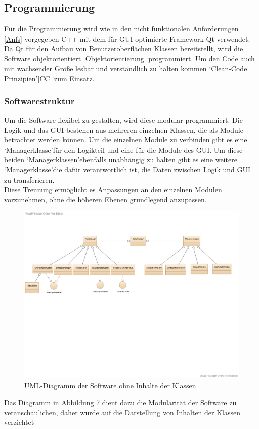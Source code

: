\documentclass[12pt,a4paper]{article}
\begin{document}
\subsection{Programmierung}
Für die Programmierung wird wie in den nicht funktionalen Anforderungen \ref{Anfs} vorgegeben C++ mit dem für GUI optimierte Framework Qt verwendet. \\
Da Qt für den Aufbau von Benutzeroberflächen Klassen bereitstellt, wird die Software objektorientiert \ref{Objektorientierung} programmiert. Um den Code auch mit wachsender Größe lesbar und verständlich zu halten kommen \lq Clean-Code Prinzipien\rq\space\ref{CC} zum Einsatz.\\
\subsubsection{Softwarestruktur}
Um die Software flexibel zu gestalten, wird diese modular programmiert. Die Logik und das GUI bestehen aus mehreren einzelnen Klassen, die als Module betrachtet werden können. Um die einzelnen Module zu verbinden gibt es eine \lq Managerklasse\rq\space für den Logikteil und eine für die Module des GUI. Um diese beiden \lq Managerklassen\rq\space ebenfalls unabhängig zu halten gibt es eine weitere \lq Managerklasse\rq\space die dafür verantwortlich ist, die Daten zwischen Logik und GUI zu transferieren. \\
Diese Trennung ermöglicht es Anpassungen an den einzelnen Modulen vorzunehmen, ohne die höheren Ebenen grundlegend anzupassen.
\begin{figure}[H]
\includegraphics[page=1,scale=0.6]{pictures_and_research/pdf_files/smallParatabUml.pdf}
\caption{UML-Diagramm der Software ohne Inhalte der Klassen}
\end{figure}\noindent
Das Diagramm in Abbildung 7 dient dazu die Modularität der Software zu veranschaulichen, daher wurde auf die Darstellung von Inhalten der Klassen verzichtet
\end{document}
